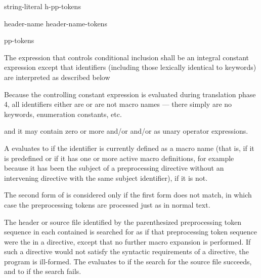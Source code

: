 \documentclass{wg21}
\begin{document}
\begin{bnf}
    \br
    string-literal\br
    \terminal{<} h-pp-tokens \terminal{>}
\end{bnf}

%
\begin{bnf}
    \br
     \terminal{(} header-name \terminal{)}\br
     \terminal{(} header-name-tokens \terminal{)}
\end{bnf}

%
\begin{bnf}
    \br
     pp-tokens \terminal{)}
\end{bnf}

\pnum
The expression that controls conditional inclusion
shall be an integral constant expression except that
identifiers
(including those lexically identical to keywords)
are interpreted as described below
\begin{footnote}
    Because the controlling constant expression is evaluated
    during translation phase 4,
    all identifiers either are or are not macro names ---
    there simply are no keywords, enumeration constants, etc.
\end{footnote}
and it may contain zero or more  and/or
 and/or
 as unary operator expressions.

\pnum
A  evaluates to 
if the identifier is currently defined
as a macro name
(that is, if it is predefined
or if it has one or more active macro definitions,
for example because
it has been the subject of a
preprocessing directive
without an intervening
directive with the same subject identifier),  if it is not.

\pnum
The second form of 
is considered only if the first form does not match,
in which case the preprocessing tokens are processed just as in normal text.

\pnum
The header or source file identified by
the parenthesized preprocessing token sequence
in each contained 
is searched for as if that preprocessing token sequence
were the  in a  directive,
except that no further macro expansion is performed.
If such a directive would not satisfy the syntactic requirements
of a  directive, the program is ill-formed.
The  evaluates
to  if the search for the source file succeeds, and
to  if the search fails.
\end{document}
